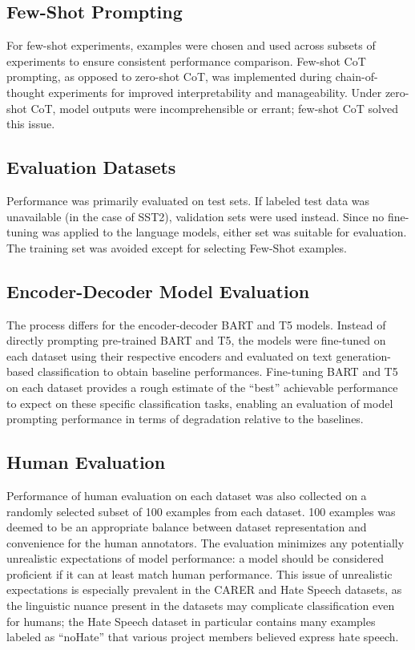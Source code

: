 \documentclass[twocolumn]{article}
\begin{document}
\subsection{Few-Shot Prompting}
For few-shot experiments, examples were chosen and used across subsets of experiments to ensure consistent performance comparison. Few-shot CoT prompting, as opposed to zero-shot CoT, was implemented during chain-of-thought experiments for improved interpretability and manageability. Under zero-shot CoT, model outputs were incomprehensible or errant; few-shot CoT solved this issue.

\subsection{Evaluation Datasets}
Performance was primarily evaluated on test sets. If labeled test data was unavailable (in the case of SST2), validation sets were used instead. Since no fine-tuning was applied to the language models, either set was suitable for evaluation. The training set was avoided except for selecting Few-Shot examples.

\subsection{Encoder-Decoder Model Evaluation}
The process differs for the encoder-decoder BART and T5 models. Instead of directly prompting pre-trained BART and T5, the models were fine-tuned on each dataset using their respective encoders and evaluated on text generation-based classification to obtain baseline performances. Fine-tuning BART and T5 on each dataset provides a rough estimate of the “best” achievable performance to expect on these specific classification tasks, enabling an evaluation of model prompting performance in terms of degradation relative to the baselines.

\subsection{Human Evaluation}
Performance of human evaluation on each dataset was also collected on a randomly selected subset of 100 examples from each dataset. 100 examples was deemed to be an appropriate balance between dataset representation and convenience for the human annotators. The evaluation minimizes any potentially unrealistic expectations of model performance: a model should be considered proficient if it can at least match human performance. This issue of unrealistic expectations is especially prevalent in the CARER and Hate Speech datasets, as the linguistic nuance present in the datasets may complicate classification even for humans; the Hate Speech dataset in particular contains many examples labeled as “noHate” that various project members believed express hate speech.
\end{document}
